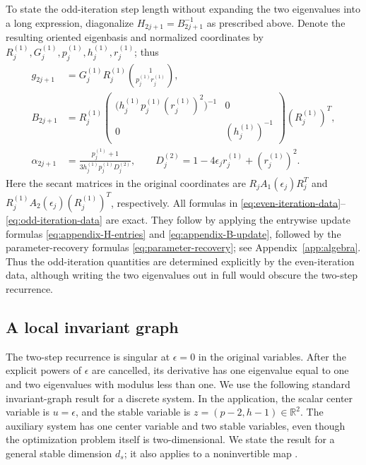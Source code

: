 \documentclass[11pt]{article}
\newcommand{\R}{\mathbb R}
\begin{document}
To state the odd-iteration step length without expanding the two eigenvalues
into a long expression, diagonalize
$H_{2j+1}=B_{2j+1}^{-1}$ as prescribed above.  Denote the resulting oriented
eigenbasis and normalized coordinates by
$R_j^{(1)},G_j^{(1)},p_j^{(1)},h_j^{(1)},r_j^{(1)}$; thus
\begin{equation}\label{eq:odd-iteration-data}
\begin{aligned}
g_{2j+1}
&=G_j^{(1)}R_j^{(1)}
\binom{1}{p_j^{(1)}r_j^{(1)}},\\
B_{2j+1}
&=R_j^{(1)}
\begin{pmatrix}
\bigl(h_j^{(1)}p_j^{(1)}(r_j^{(1)})^2\bigr)^{-1}&0\\[1mm]
0&(h_j^{(1)})^{-1}
\end{pmatrix}(R_j^{(1)})^T,\\
\alpha_{2j+1}
&=\frac{p_j^{(1)}+1}
{3h_j^{(1)}p_j^{(1)}D_j^{(2)}},
\qquad
D_j^{(2)}=1-4\epsilon_jr_j^{(1)}+(r_j^{(1)})^2.
\end{aligned}
\end{equation}
Here the secant matrices in the original coordinates are
$R_jA_1(\epsilon_j)R_j^T$ and
$R_j^{(1)}A_2(\epsilon_j)(R_j^{(1)})^T$, respectively.  All formulas in
\eqref{eq:even-iteration-data}--\eqref{eq:odd-iteration-data} are exact.  They
follow by applying the entrywise update formulas
\eqref{eq:appendix-H-entries} and \eqref{eq:appendix-B-update}, followed by
the parameter-recovery formulas \eqref{eq:parameter-recovery}; see
Appendix~\ref{app:algebra}.  Thus the odd-iteration quantities are determined
explicitly by the even-iteration data, although writing the two eigenvalues
out in full would obscure the two-step recurrence.

\subsection{A local invariant graph}

The two-step recurrence is singular at $\epsilon=0$ in the original
variables.  After the explicit powers of $\epsilon$ are cancelled, its
derivative has one eigenvalue equal to one and two eigenvalues with modulus
less than one.  We use the following standard invariant-graph result for a
discrete system.  In the application, the scalar center variable is
$u=\epsilon$, and the stable variable is
$z=(p-2,h-1)\in\R^2$.  The auxiliary system has one center variable and
two stable variables, even though the optimization problem itself is
two-dimensional.  We state the result for a general stable dimension $d_s$;
it also applies to a noninvertible map \cite{KarydasSchinas1992}.
\end{document}
